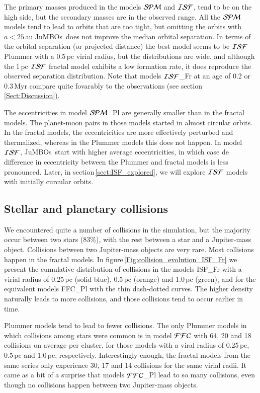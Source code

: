 \documentclass[submission,phys]{lib/SciPost}
\newcommand{\jumbos}{\mbox{JuMBOs}}
\begin{document}
The primary masses produced in the models ${\cal SPM}$ and ${\cal
  ISF}$, tend to be on the high side, but the secondary masses are in
the observed range.  All the ${\cal SPM}$ models tend to lead to
orbits that are too tight, but omitting the orbits with $a<25$\,au
\jumbos\, does not improve the median orbital separation.  In terms of
the orbital separation (or projected distance) the best model seems to
be ${\cal ISF}$ Plummer with a 0.5\,pc virial radius, but the
distributions are wide, and although the 1\,pc ${\cal ISF}$ fractal
model exhibits a low formation rate, it does reproduce the observed
separation distribution. Note that models ${\cal ISF}$\_Fr at an age
of 0.2 or 0.3\,Myr compare quite fovarably to the observations (see
section\,\ref{Sect:Discussion}).

The eccentricities in model ${\cal SPM}$\_Pl are generally smaller
than in the fractal models.  The planet-moon pairs in those models
started in almost circular orbits.  In the fractal models, the
eccentricities are more effectively perturbed and thermalized, whereas
in the Plummer models this does not happen.  In model ${\cal ISF}$,
\jumbos\, start with higher average eccentricities, in which case de
difference in eccentricity between the Plummer and fractal models is
less pronounced. Later, in section\,\ref{sect:ISF_explored}, we will
explore ${\cal ISF}$ models with initially curcular orbits.

\subsection{Stellar and planetary collisions}\label{Sect:collisions}

We encountered quite a number of collisions in the simulation, but the
majority occur between two stars (83\%), with the rest between a star
and a Jupiter-mass object.  Collisions between two Jupiter-mass
objects are very rare.  Most collisions happen in the fractal models.
In figure\,\ref{Fig:collision_evolution_ISF_Fr} we present the
cumulative distribution of collisions in the models {\cal ISF}\_Fr
with a virial radius of 0.25\,pc (solid blue), 0.5\,pc (orange) and
1.0\,pc (green), and for the equivalent models {\cal FFC}\_Pl with the
thin dash-dotted curves.  The higher density naturally leads to more
collisions, and those collisions tend to occur earlier in time.  

Plummer models tend to lead to fewer collisions.  The only Plummer
models in which collisions among stars were common is in model ${\cal
  FFC}$ with 64, 20 and 18 collisions on average per cluster, for
those models with a viral radius of 0.25\,pc, 0.5\,pc and 1.0\,pc,
respectively.  Interestingly enough, the fractal models from the same
series only experience 30, 17 and 14 collisions for the same virial
radii.  It came as a bit of a surprise that models ${\cal FFC}$\_Pl
lead to so many collisions, even though no collisions happen between
two Jupiter-mass objects.
\end{document}
